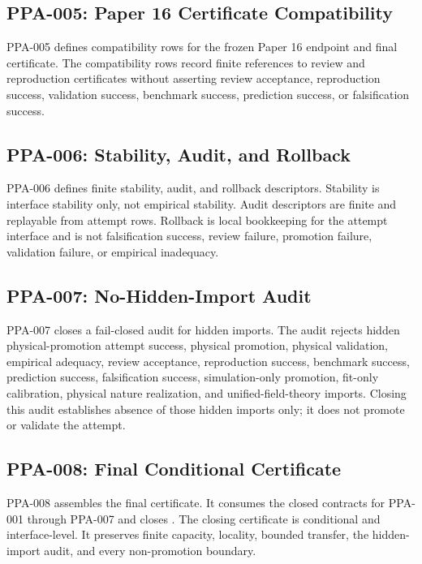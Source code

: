 \documentclass{article}
\begin{document}
\subsection{PPA-005: Paper 16 Certificate Compatibility}

PPA-005 defines compatibility rows for the frozen Paper 16 endpoint and final
certificate. The compatibility rows record finite references to review and
reproduction certificates without asserting review acceptance, reproduction
success, validation success, benchmark success, prediction success, or
falsification success.

\subsection{PPA-006: Stability, Audit, and Rollback}

PPA-006 defines finite stability, audit, and rollback descriptors. Stability
is interface stability only, not empirical stability. Audit descriptors are
finite and replayable from attempt rows. Rollback is local bookkeeping for the
attempt interface and is not falsification success, review failure, promotion
failure, validation failure, or empirical inadequacy.

\subsection{PPA-007: No-Hidden-Import Audit}

PPA-007 closes a fail-closed audit for hidden imports. The audit rejects
hidden physical-promotion attempt success, physical promotion, physical
validation, empirical adequacy, review acceptance, reproduction success,
benchmark success, prediction success, falsification success, simulation-only
promotion, fit-only calibration, physical nature realization, and
unified-field-theory imports. Closing this audit establishes absence of those
hidden imports only; it does not promote or validate the attempt.

\subsection{PPA-008: Final Conditional Certificate}

PPA-008 assembles the final certificate. It consumes the closed contracts for
PPA-001 through PPA-007 and closes
. The closing
certificate is conditional and interface-level. It preserves finite capacity,
locality, bounded transfer, the hidden-import audit, and every non-promotion
boundary.
\end{document}

